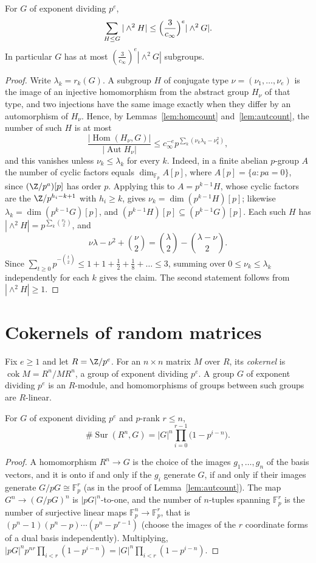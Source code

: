 \begin{lemma}\label{lem:subgroupsum}
For $G$ of exponent dividing $p^e$,
\[
\sum_{H\le G}|\wedge^2H|\le\Bigl(\frac3{c_\infty}\Bigr)^e|\wedge^2G|.
\]
In particular $G$ has at most $(\frac3{c_\infty})^e|\wedge^2G|$ subgroups.
\end{lemma}
\begin{proof}
Write $\lambda_k=r_k(G)$. A subgroup $H$ of conjugate type $\nu=(\nu_1,\dots,\nu_e)$ is the image of an injective homomorphism from the abstract group $H_\nu$ of that type, and two injections have the same image exactly when they differ by an automorphism of $H_\nu$. Hence, by Lemmas~\ref{lem:homcount} and~\ref{lem:autcount}, the number of such $H$ is at most
\[
\frac{|\operatorname{Hom}(H_\nu,G)|}{|\operatorname{Aut}H_\nu|}\le c_\infty^{-e}p^{\sum_k(\nu_k\lambda_k-\nu_k^2)},
\]
and this vanishes unless $\nu_k\le\lambda_k$ for every $k$. Indeed, in a finite abelian $p$-group $A$ the number of cyclic factors equals $\dim_{\mathbb F_p}A[p]$, where $A[p]=\{a:pa=0\}$, since $(\Z/p^a)[p]$ has order $p$. Applying this to $A=p^{k-1}H$, whose cyclic factors are the $\Z/p^{h_i-k+1}$ with $h_i\ge k$, gives $\nu_k=\dim(p^{k-1}H)[p]$; likewise $\lambda_k=\dim(p^{k-1}G)[p]$, and $(p^{k-1}H)[p]\subseteq(p^{k-1}G)[p]$. Each such $H$ has $|\wedge^2H|=p^{\sum_k\binom{\nu_k}2}$, and
\[
\nu\lambda-\nu^2+\binom\nu2=\binom\lambda2-\binom{\lambda-\nu}2.
\]
Since $\sum_{t\ge0}p^{-\binom t2}\le1+1+\frac12+\frac18+\dots\le3$, summing over $0\le\nu_k\le\lambda_k$ independently for each $k$ gives the claim. The second statement follows from $|\wedge^2H|\ge1$.
\end{proof}

\section{Cokernels of random matrices}

Fix $e\ge1$ and let $R=\Z/p^e$. For an $n\times n$ matrix $M$ over $R$, its \emph{cokernel} is $\operatorname{cok}M=R^n/MR^n$, a group of exponent dividing $p^e$. A group $G$ of exponent dividing $p^e$ is an $R$-module, and homomorphisms of groups between such groups are $R$-linear.

\begin{proposition}\label{prop:freesur}
For $G$ of exponent dividing $p^e$ and $p$-rank $r\le n$,
\[
\#\operatorname{Sur}(R^n,G)=|G|^n\prod_{i=0}^{r-1}\bigl(1-p^{i-n}\bigr).
\]
\end{proposition}
\begin{proof}
A homomorphism $R^n\to G$ is the choice of the images $g_1,\dots,g_n$ of the basis vectors, and it is onto if and only if the $g_i$ generate $G$, if and only if their images generate $G/pG\cong\mathbb F_p^r$ (as in the proof of Lemma~\ref{lem:autcount}). The map $G^n\to(G/pG)^n$ is $|pG|^n$-to-one, and the number of $n$-tuples spanning $\mathbb F_p^r$ is the number of surjective linear maps $\mathbb F_p^n\to\mathbb F_p^r$, that is $(p^n-1)(p^n-p)\cdots(p^n-p^{r-1})$ (choose the images of the $r$ coordinate forms of a dual basis independently). Multiplying, $|pG|^np^{nr}\prod_{i<r}(1-p^{i-n})=|G|^n\prod_{i<r}(1-p^{i-n})$.
\end{proof}

